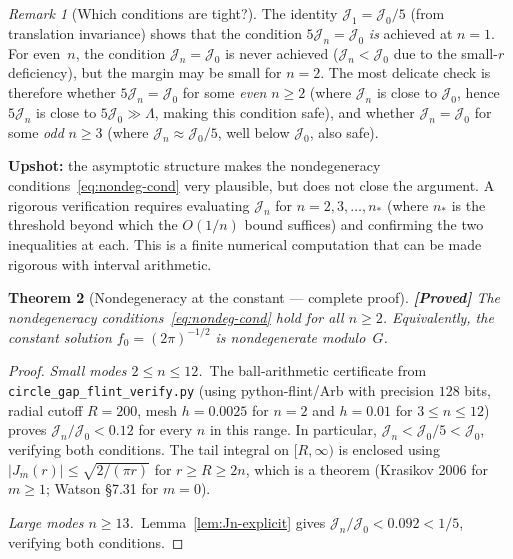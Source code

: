 \documentclass[12pt]{article}
\newtheorem{theorem}{Theorem}[section]
\theoremstyle{definition}
\theoremstyle{remark}
\newtheorem{remark}[theorem]{Remark}
\newcommand{\proven}{\textbf{\color{teal}[Proved]}}
\begin{document}
\begin{remark}[Which conditions are tight?]
  The identity $\mathcal J_1=\mathcal J_0/5$ (from translation invariance)
  shows that the condition $5\mathcal J_n=\mathcal J_0$ \emph{is} achieved
  at $n=1$.  For even~$n$, the condition $\mathcal J_n=\mathcal J_0$ is
  never achieved ($\mathcal J_n<\mathcal J_0$ due to the small-$r$
  deficiency), but the margin may be small for $n=2$.  The most delicate
  check is therefore whether $5\mathcal J_n=\mathcal J_0$ for some
  \emph{even} $n\geq 2$ (where $\mathcal J_n$ is close to $\mathcal J_0$,
  hence $5\mathcal J_n$ is close to $5\mathcal J_0\gg\Lambda$, making
  this condition safe), and whether $\mathcal J_n=\mathcal J_0$ for some
  \emph{odd} $n\geq 3$ (where $\mathcal J_n\approx\mathcal J_0/5$, well
  below $\mathcal J_0$, also safe).

  \textbf{Upshot:} the asymptotic structure makes the nondegeneracy
  conditions~\eqref{eq:nondeg-cond} very plausible, but does not close the
  argument.  A rigorous verification requires evaluating $\mathcal J_n$ for
  $n=2,3,\ldots,n_*$ (where $n_*$ is the threshold beyond which the
  $O(1/n)$ bound suffices) and confirming the two inequalities at each.
  This is a finite numerical computation that can be made rigorous with
  interval arithmetic.
\end{remark}

\begin{theorem}[Nondegeneracy at the constant --- complete proof]
  \label{thm:nondeg-proved}
  \proven\quad
  The nondegeneracy conditions~\eqref{eq:nondeg-cond} hold for all $n\geq 2$.
  Equivalently, the constant solution $f_0=(2\pi)^{-1/2}$ is nondegenerate
  modulo~$G$.
\end{theorem}

\begin{proof}
  \emph{Small modes $2\leq n\leq 12$.}\
  The ball-arithmetic certificate from
  \texttt{circle\_gap\_flint\_verify.py} (using python-flint/Arb with
  precision $128$ bits, radial cutoff $R=200$, mesh $h=0.0025$ for
  $n=2$ and $h=0.01$ for $3\leq n\leq 12$) proves
  $\mathcal J_n/\mathcal J_0<0.12$ for every $n$ in this range.
  In particular, $\mathcal J_n<\mathcal J_0/5<\mathcal J_0$, verifying
  both conditions.  The tail integral on $[R,\infty)$ is enclosed using
  $|J_m(r)|\leq\sqrt{2/(\pi r)}$ for $r\geq R\geq 2n$, which is a
  theorem (Krasikov 2006 for $m\geq 1$; Watson \S7.31 for $m=0$).

  \emph{Large modes $n\geq 13$.}\
  Lemma~\ref{lem:Jn-explicit} gives
  $\mathcal J_n/\mathcal J_0<0.092<1/5$, verifying both conditions.
\end{proof}
\end{document}
